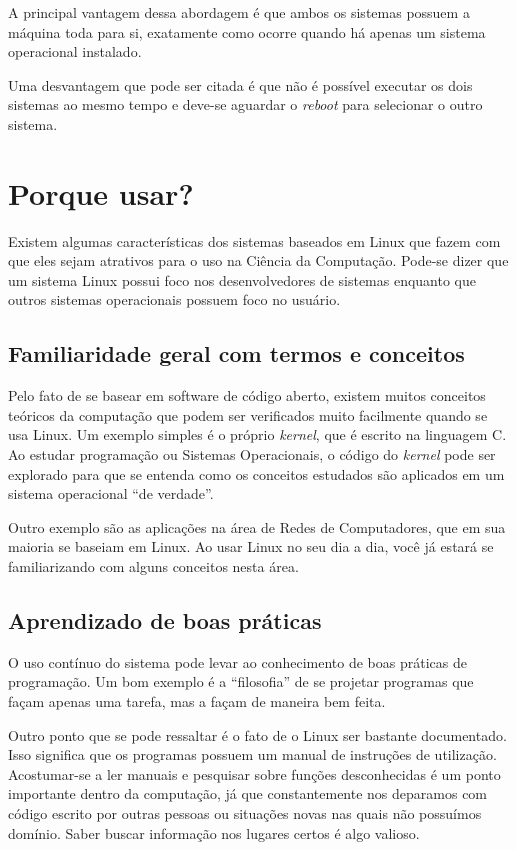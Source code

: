 \documentclass{handout_utfpr}
\begin{document}
A principal vantagem dessa abordagem é que ambos os sistemas possuem a máquina toda para si, exatamente como ocorre quando há apenas um sistema operacional instalado.

Uma desvantagem que pode ser citada é que não é possível executar os dois sistemas ao mesmo tempo e deve-se aguardar o \textit{reboot} para selecionar o outro sistema.

\section{Porque usar?}
Existem algumas características dos sistemas baseados em Linux que fazem com que eles sejam atrativos para o uso na Ciência da Computação. Pode-se dizer que um sistema Linux possui foco nos desenvolvedores de sistemas enquanto que outros sistemas operacionais possuem foco no usuário.

\subsection{Familiaridade geral com termos e conceitos}
Pelo fato de se basear em software de código aberto, existem muitos conceitos teóricos da computação que podem ser verificados muito facilmente quando se usa Linux. Um exemplo simples é o próprio \textit{kernel}, que é escrito na linguagem C. Ao estudar programação ou Sistemas Operacionais, o código do \textit{kernel} pode ser explorado para que se entenda como os conceitos estudados são aplicados em um sistema operacional ``de verdade''.

Outro exemplo são as aplicações na área de Redes de Computadores, que em sua maioria se baseiam em Linux. Ao usar Linux no seu dia a dia, você já estará se familiarizando com alguns conceitos nesta área.

\subsection{Aprendizado de boas práticas}
O uso contínuo do sistema pode levar ao conhecimento de boas práticas de programação. Um bom exemplo é a ``filosofia'' de se projetar programas que façam apenas uma tarefa, mas a façam de maneira bem feita.

Outro ponto que se pode ressaltar é o fato de o Linux ser bastante documentado. Isso significa que os programas possuem um manual de instruções de utilização. Acostumar-se a ler manuais e pesquisar sobre funções desconhecidas é um ponto importante dentro da computação, já que constantemente nos deparamos com código escrito por outras pessoas ou situações novas nas quais não possuímos domínio. Saber buscar informação nos lugares certos é algo valioso.
\end{document}
